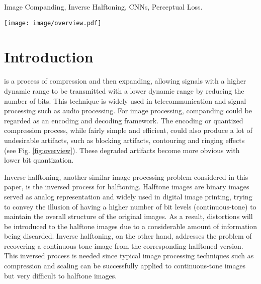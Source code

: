 \documentclass[journal]{IEEEtran}
\begin{document}
\begin{IEEEkeywords}
Image Companding, Inverse Halftoning, CNNs, Perceptual Loss.
\end{IEEEkeywords}



%
\IEEEpeerreviewmaketitle


\begin{figure*}
\centering
  \texttt{[image: image/overview.pdf]}
  \caption{Method overview. A transformation convolutional neural network (CNN) to expand lower-bit images to higher-bit ones. A pretrained deep CNN for constructing perceptual loss to train the transformation network.}
  \label{fig:overview}
\end{figure*}


\section{Introduction}
 is a process of compression and then expanding, allowing signals with a higher dynamic range to be transmitted with a lower dynamic range by reducing the number of bits. This technique is widely used in telecommunication and signal processing such as audio processing. For image processing, companding could be regarded as an encoding and decoding framework. The encoding or quantized compression process, while fairly simple and efficient, could also produce a lot of undesirable artifacts, such as blocking artifacts, contouring and ringing effects (see Fig. \ref{fig:overview}). These degraded artifacts become more obvious with lower bit quantization.

Inverse halftoning, another similar image processing problem considered in this paper, is the inversed process for halftoning. Halftone images are binary images served as analog representation and widely used in digital image printing, trying to convey the illusion of having a higher number of bit levels (continuous-tone) to maintain the overall structure of the original images. As a result, distortions will be introduced to the halftone images due to a considerable amount of information being discarded. Inverse halftoning, on the other hand, addresses the problem of recovering a continuous-tone image from the corresponding halftoned version. This inversed process is needed since typical image processing techniques such as compression and scaling can be successfully applied to continuous-tone images but very difficult to halftone images.
\end{document}
